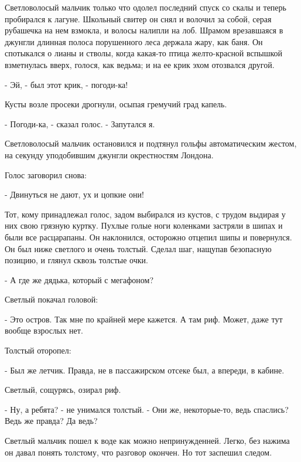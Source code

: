 \documentclass[12pt]{article}
\begin{document}

\thispagestyle{empty}

    Светловолосый  мальчик  только  что  одолел  последний спуск со скалы и
теперь пробирался к лагуне. Школьный свитер он  снял  и  волочил  за  собой,
серая  рубашечка на нем взмокла, и волосы налипли на лоб. Шрамом врезавшаяся
в джунгли длинная  полоса  порушенного  леса  держала  жару,  как  баня.  Он
спотыкался  о  лианы  и  стволы, когда какая-то птица желто-красной вспышкой
взметнулась вверх, голося, как ведьма; и на ее крик эхом отозвался другой.

    - Эй, - был этот крик, - погоди-ка!

    Кусты возле просеки дрогнули, осыпая гремучий град капель.

    - Погоди-ка, - сказал голос. - Запутался я.

    Светловолосый мальчик  остановился  и  подтянул  гольфы  автоматическим
жестом, на секунду уподобившим джунгли окрестностям Лондона.

    Голос заговорил снова:

    - Двинуться не дают, ух и цопкие они!

    Тот,  кому  принадлежал  голос,  задом  выбирался  из  кустов, с трудом
выдирая у них свою грязную куртку. Пухлые голые ноги  коленками  застряли  в
шипах  и  были  все  расцарапаны.  Он  наклонился,  осторожно отцепил шипы и
повернулся. Он был ниже  светлого  и  очень  толстый.  Сделал  шаг,  нащупав
безопасную позицию, и глянул сквозь толстые очки.

    - А где же дядька, который с мегафоном?

    Светлый покачал головой:

    - Это  остров.  Так мне по крайней мере кажется. А там риф. Может, даже
тут вообще взрослых нет.

    Толстый оторопел:

    - Был же летчик. Правда, не в пассажирском отсеке  был,  а  впереди,  в
кабине.

    Светлый, сощурясь, озирал риф.

    - Ну,  а  ребята?  -  не унимался толстый. - Они же, некоторые-то, ведь
спаслись? Ведь же правда? Да ведь?

    Светлый мальчик пошел к  воде  как  можно  непринужденней.  Легко,  без
нажима  он  давал  понять  толстому,  что  разговор окончен. Но тот заспешил
следом.
\end{document}
